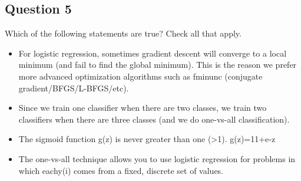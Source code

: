 \documentclass[11pt]{article} %
\begin{document}
\subsection{Question 5}
Which of the following statements are true? Check all that apply.

\begin{itemize}
\item For logistic regression, sometimes gradient descent will converge to a local minimum (and fail to find the global minimum). This is the reason we prefer more advanced optimization algorithms such as fminunc (conjugate gradient/BFGS/L-BFGS/etc).

\item Since we train one classifier when there are two classes, we train two classifiers when there are three classes (and we do one-vs-all classification).

\item The sigmoid function g(z) is never greater than one (>1). g(z)=11+e-z

\item 
The one-vs-all technique allows you to use logistic regression for problems in which eachy(i) comes from a fixed, discrete set of values.
\end{itemize}


\end{document}

